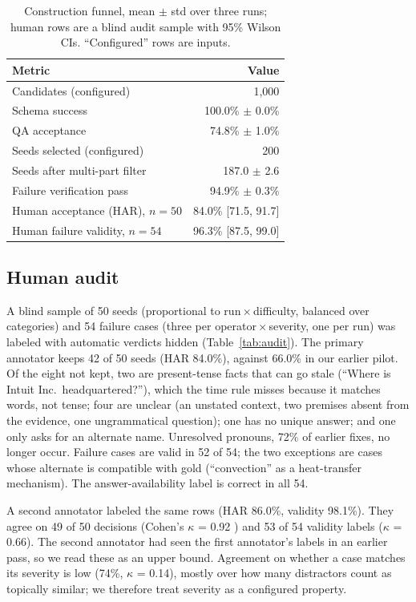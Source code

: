 \documentclass[conference]{IEEEtran}
\newcommand{\op}[1]{\texttt{\detokenize{#1}}}
\begin{document}
\begin{table}[t]
\centering
\caption{Construction funnel, mean $\pm$ std over three runs; human rows are a blind audit sample with 95\% Wilson CIs. ``Configured'' rows are inputs.}
\label{tab:pipeline}
\footnotesize
\begin{tabular}{@{}lr@{}}
\toprule
Metric & Value \\
\midrule
Candidates (configured) & 1,000 \\
Schema success & 100.0\% $\pm$ 0.0\% \\
QA acceptance & 74.8\% $\pm$ 1.0\% \\
Seeds selected (configured) & 200 \\
Seeds after multi-part filter & 187.0 $\pm$ 2.6 \\
Failure verification pass & 94.9\% $\pm$ 0.3\% \\
Human acceptance (HAR), $n{=}50$ & 84.0\% [71.5, 91.7] \\
Human failure validity, $n{=}54$ & 96.3\% [87.5, 99.0] \\
\bottomrule
\end{tabular}
\end{table}

\subsection{Human audit}
\label{sec:humanresults}
A blind sample of 50 seeds (proportional to run\,$\times$\,difficulty, balanced over
categories) and 54 failure cases (three per operator\,$\times$\,severity, one per run) was
labeled with automatic verdicts hidden (Table~\ref{tab:audit}). The primary annotator keeps
42 of 50 seeds (HAR 84.0\%), against 66.0\% in our earlier pilot. Of the eight not kept, two are
present-tense facts that can go stale (``Where is Intuit Inc.\ headquartered?''), which the
time rule misses because it matches words, not tense; four are unclear (an unstated context, two
premises absent from the evidence, one ungrammatical question); one has no unique answer; and
one only asks for an alternate name. Unresolved pronouns, 72\% of earlier fixes, no longer
occur. Failure cases are valid in 52 of 54; the two exceptions are \op{conflict} cases whose
alternate is compatible with gold (``convection'' as a heat-transfer mechanism). The
answer-availability label is correct in all 54.

A second annotator labeled the same rows (HAR 86.0\%, validity 98.1\%). They agree on 49 of 50
decisions (Cohen's $\kappa$ = 0.92 \cite{cohen1960}) and 53 of 54 validity labels
($\kappa$ = 0.66). The second annotator had seen the first annotator's labels in an earlier
pass, so we read these as an upper bound. Agreement on whether a case matches its severity is
low (74\%, $\kappa$ = 0.14), mostly over how many \op{context_noise} distractors count as
topically similar; we therefore treat severity as a configured property.
\end{document}
